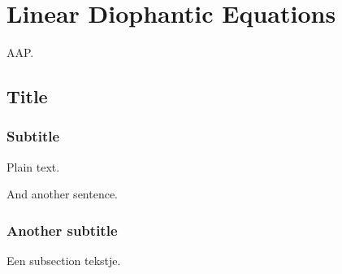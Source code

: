 \documentclass[oneside]{book}
\theoremstyle{definition}
\begin{document}
	\tableofcontents

    \chapter{Linear Diophantic Equations}
%    
%     

\newpage
AAP.


\section{Title}

\subsection{Subtitle}

Plain text.

And another sentence.

\subsection{Another subtitle}

Een subsection tekstje.
\end{document}
